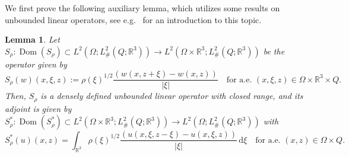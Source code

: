 \documentclass[reqno,11pt]{amsart}
\numberwithin{equation}{section}
\theoremstyle{thmlemcorr}
\numberwithin{theorem}{section}
\newtheorem{lemma}[theorem]{Lemma}
\theoremstyle{thmlemcorr*}
\theoremstyle{defi}
\theoremstyle{remexample}
\theoremstyle{ass}
\newcommand{\R}{\mathbb{R}}
\newcommand{\dd}{\,\mathrm{d}}
\newcommand{\1}{\mathds{1}}
\DeclareMathOperator{\Dom}{Dom}
\newcommand{\veps}{\varepsilon}
\begin{document}
We first prove the following auxiliary lemma, which utilizes some results on unbounded linear operators, see e.g.~\cite[Chapter~2]{Bre11} for an introduction to this topic.
\begin{lemma}\label{le:Aoperator}
    Let $S_\rho:\Dom(S_\rho) \subset L^2(\Omega ;L^2_{\#}(Q;\R^3)) \to L^2(\Omega\times\R^3;L^2_{\#}(Q;\R^3))$ be the operator given by
    \[
    S_\rho(w)(x,\xi,z):= \rho(\xi)^{1/2}\frac{(w(x,z+\xi)-w(x,z))}{|\xi|} \quad \text{for a.e.~$(x,\xi,z) \in \Omega\times \R^3\times Q$}.
    \]
    Then, $S_\rho$ is a densely defined unbounded linear operator with closed range, and its adjoint is given by $S_\rho^*:\Dom(S^*_\rho) \subset L^2(\Omega\times\R^3;L^2_{\#}(Q;\R^3)) \to L^2(\Omega ;L^2_{\#}(Q;\R^3))$ with
    \begin{equation}\label{eq:Aadjoint}
    S^*_\rho(u)(x,z)=\int_{\R^3}\rho(\xi)^{1/2}\frac{(u(x,\xi,z-\xi)-u(x,\xi,z))}{|\xi|}\dd \xi  \quad \text{for a.e.~$(x,z) \in \Omega \times Q$}.
    \end{equation}
\end{lemma}
\end{document}
